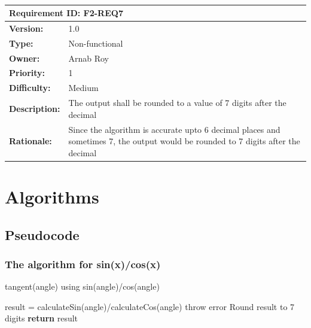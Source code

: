 \documentclass[paper=a4, fontsize=11pt,twoside]{scrartcl}	%
\begin{document}
    \\[10pt]
    \begin{tabular}{ |p{4cm} | p{10cm}| }
     \hline
     \multicolumn{2}{|l|}{\textbf{Requirement ID: F2-REQ7}}\\
     \hline
     \textbf{Version:} & 1.0\\
     \textbf{Type:} & Non-functional\\
     \textbf{Owner:} & Arnab Roy\\
     \textbf{Priority:} & 1\\
     \textbf{Difficulty:} & Medium\\
     \textbf{Description:} & The output shall be rounded to a value of 7 digits after the decimal\\
     \textbf{Rationale:} & Since the algorithm is accurate upto 6 decimal places and sometimes 7, the output would be rounded to 7 digits after the decimal\\
     \hline
    \end{tabular}
    \section{Algorithms}
\subsection{Pseudocode}
\subsubsection{The algorithm for sin(x)/cos(x)}
\begin{algorithm}[H]
	\caption{tangent(angle) using sin(angle)/cos(angle)} 
	\begin{algorithmic}[1]
		\State result = calculateSin(angle)/calculateCos(angle)
		\State throw error
		\EndIf
		\State Round result to 7 digits
        \State \textbf{return} result
	\end{algorithmic} 
\end{algorithm}
\end{document}
